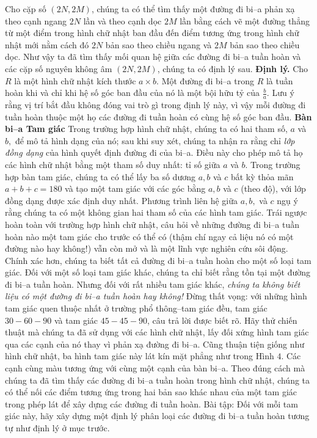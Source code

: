 \begin{multicols}{2}
	Cho cặp số $(2N, 2M)$, chúng ta có thể tìm thấy một đường đi bi--a phản xạ theo cạnh ngang $2N$ lần và theo cạnh dọc $2M$ lần bằng cách vẽ một đường thẳng từ một điểm trong hình chữ nhật ban đầu đến điểm tương ứng trong hình chữ nhật mới nằm cách đó $2N$ bản sao theo chiều ngang và $2M$ bản sao theo chiều dọc. Như vậy ta đã tìm thấy mối quan hệ giữa các đường đi bi--a tuần hoàn và các cặp số nguyên không âm $(2N, 2M)$, chúng ta có định lý sau.
	\vskip 0.1cm
	{\bf\color{duongvaotoanhoc}Định lý.} Cho $R$ là một hình chữ nhật kích thước $a\times b$. Một đường đi bi--a trong $R$ là tuần hoàn khi và chỉ khi hệ số góc ban đầu của nó là một bội hữu tỷ của  $\frac{b}{a}.$
	\vskip 0.1cm
	Lưu ý rằng vị trí bắt đầu không đóng vai trò gì trong định lý này, vì vậy mỗi đường đi tuần hoàn thuộc một họ các đường đi tuần hoàn có cùng hệ số góc ban đầu.
	\vskip 0.1cm
	{\bf\color{duongvaotoanhoc}Bàn bi--a Tam giác}
	\vskip 0.1cm
	Trong trường hợp hình chữ nhật, chúng ta có hai tham số, $a$ và $b,$ để mô tả hình dạng của nó; sau khi suy xét, chúng ta nhận ra rằng chỉ \emph{lớp đồng dạng} của hình quyết định
	đường đi của bi--a. Điều này cho phép mô tả họ các hình chữ nhật bằng  một tham số duy nhất:
	tỉ số giữa $a$ và $b.$
	\vskip 0.1cm
	Trong trường hợp bàn tam giác, chúng ta có thể lấy ba số dương $a, b$ và $c$ bất kỳ thỏa mãn $a+b+c=180$ và tạo một tam giác với các góc bằng $a, b$ và $c$ (theo độ), với lớp đồng dạng được xác định duy nhất.
	Phương trình liên hệ giữa $a, b,$ và $c$ ngụ ý rằng chúng ta có một không gian hai tham số của các hình tam giác. 
	\vskip 0.1cm
	Trái ngược hoàn toàn với trường hợp hình chữ nhật, câu hỏi về những đường đi bi--a tuần hoàn nào  một tam giác cho trước có thể có (thậm chí ngay cả liệu nó có một đường nào hay không!) vẫn còn mở và là một lĩnh vực nghiên cứu sôi động. Chính xác hơn, chúng ta biết tất cả đường đi bi--a tuần hoàn cho một số loại tam giác. Đối với một số loại tam giác khác, chúng ta chỉ biết rằng tồn tại một  đường đi bi--a tuần hoàn. Nhưng đối với rất nhiều tam giác  khác, \emph{chúng ta không biết liệu có một đường đi bi--a tuần hoàn hay không!}
	\vskip 0.1cm
	Đừng thất vọng: với những hình tam giác quen thuộc nhất ở trường phổ thông--tam giác đều, tam giác $30-60-90$ và tam giác $45-45-90$, câu trả lời được biết rõ.
	\vskip 0.1cm
	Hãy thử chiến thuật mà chúng ta đã sử dụng với các hình chữ nhật, lấy đối xứng hình tam giác qua các cạnh của nó thay vì phản xạ  đường đi bi--a. Cũng thuận tiện giống như hình chữ nhật, ba hình tam giác này lát kín mặt phẳng như trong Hình $4$.  Các cạnh cùng màu tương ứng với cùng một cạnh của bàn bi--a. 
	\vskip 0.1cm
	Theo đúng cách mà chúng ta đã tìm thấy các đường đi bi--a tuần hoàn trong hình chữ nhật, chúng ta có thể nối các điểm tương ứng trong hai bản sao khác nhau của một tam giác trong phép lát để xây dựng các đường đi tuần hoàn. Bài tập: Đối với mỗi tam giác này, hãy xây dựng một định lý phân loại các đường đi bi--a tuần hoàn tương tự như định lý ở mục trước.
	\end{multicols}
